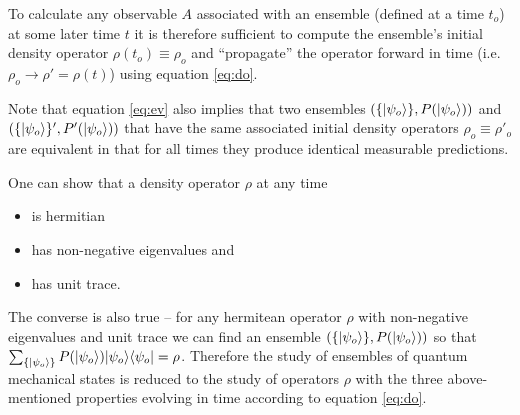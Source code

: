 To calculate any observable $A$ associated with an ensemble (defined at a time $t_o$) at some later time $t$ it is therefore sufficient to compute the ensemble's initial density operator $\rho(t_o) \equiv \rho_o$ and ``propagate'' the operator forward in time (i.e. $\rho_o \to \rho' = \rho(t)$) using equation \eqref{eq:do}.

Note that equation \eqref{eq:ev} also implies that two ensembles 
$\left( \{ | {\psi_o} \rangle \}, P(| {\psi_o} \rangle) \right)$ and $ \left( \{ | {\psi_o} \rangle \}', P'(| {\psi_o} \rangle)\right)$ 
that have the same associated initial density operators $\rho_o \equiv \rho'_o$ are equivalent in that for all times they produce identical measurable predictions.

One can show that a density operator $\rho$ at any time
\begin{itemize}
    \item is hermitian
    \item has non-negative eigenvalues and
    \item has unit trace.
\end{itemize}
The converse is also true -- for any hermitean operator $\rho$ with non-negative eigenvalues and unit trace we can find an ensemble 
$\left( \{ | {\psi_o} \rangle \}, P(| {\psi_o} \rangle) \right)$ so that $\sum_{\{| {\psi_o} \rangle\}} P(| {\psi_o} \rangle) | {\psi_o} \rangle \langle {\psi_o} | = \rho$. 
Therefore the study of ensembles of quantum mechanical states is reduced to the study of operators $\rho$ with the three above-mentioned properties evolving in time according to equation \eqref{eq:do}.